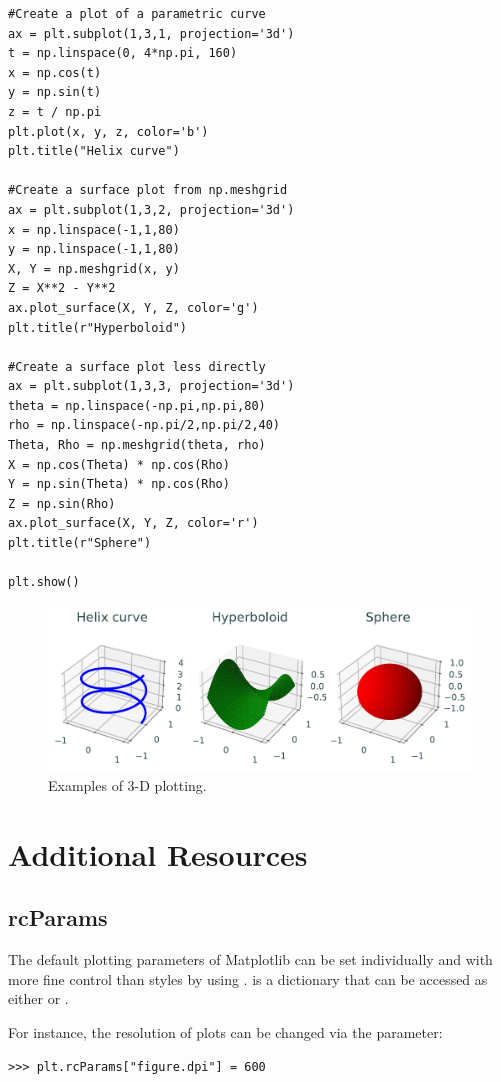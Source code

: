 \begin{lstlisting}
#Create a plot of a parametric curve
ax = plt.subplot(1,3,1, projection='3d')
t = np.linspace(0, 4*np.pi, 160)
x = np.cos(t)
y = np.sin(t)
z = t / np.pi
plt.plot(x, y, z, color='b')
plt.title("Helix curve")

#Create a surface plot from np.meshgrid
ax = plt.subplot(1,3,2, projection='3d')
x = np.linspace(-1,1,80)
y = np.linspace(-1,1,80)
X, Y = np.meshgrid(x, y)
Z = X**2 - Y**2
ax.plot_surface(X, Y, Z, color='g')
plt.title(r"Hyperboloid")

#Create a surface plot less directly
ax = plt.subplot(1,3,3, projection='3d')
theta = np.linspace(-np.pi,np.pi,80)
rho = np.linspace(-np.pi/2,np.pi/2,40)
Theta, Rho = np.meshgrid(theta, rho)
X = np.cos(Theta) * np.cos(Rho)
Y = np.sin(Theta) * np.cos(Rho)
Z = np.sin(Rho)
ax.plot_surface(X, Y, Z, color='r')
plt.title(r"Sphere")

plt.show()
\end{lstlisting}
\begin{figure}[H]
\centering
\includegraphics[width=\textwidth]{figures/3d_example.pdf}
\caption{Examples of 3-D plotting.}
\label{mpl:3d}
\end{figure}

\section*{Additional Resources} %
\subsection*{rcParams}
The default plotting parameters of Matplotlib can be set individually and with more fine control than styles by using .
 is a dictionary that can be accessed as either  or .

For instance, the resolution of plots can be changed via the  parameter:
\begin{lstlisting}
>>> plt.rcParams["figure.dpi"] = 600
\end{lstlisting}

